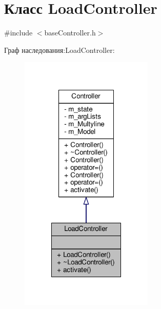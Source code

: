 \hypertarget{class_load_controller}{\section{Класс Load\-Controller}
\label{class_load_controller}
}


{\ttfamily \#include $<$base\-Controller.\-h$>$}



Граф наследования\-:Load\-Controller\-:
\nopagebreak
\begin{figure}[H]
\begin{center}
\leavevmode
\includegraphics[width=180pt]{class_load_controller__inherit__graph}
\end{center}
\end{figure}


